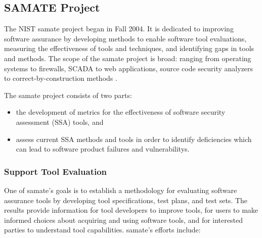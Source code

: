 \subsection{SAMATE Project}

The NIST \gls{samate} project began in Fall 2004. It is dedicated to improving software assurance by developing methods to enable software tool evaluations, measuring the effectiveness of tools and techniques, and identifying gaps in tools and methods. The scope of the \gls{samate} project is broad: ranging from operating systems to firewalls, SCADA to web applications, source code security analyzers to correct-by-construction methods \cite{nist2016samatepresentation}.

The \gls{samate} project consists of two parts:

\begin{itemize}
    \item the development of metrics for the effectiveness of software security assessment (SSA) tools, and
    \item assess current SSA methods and tools in order to identify deficiencies which can lead to software product failures and \glspl{vulnerability}. 
\end{itemize}

\clearpage

\subsubsection{Support Tool Evaluation}

One of \gls{samate}'s goals is to establish a methodology for evaluating software assurance tools by developing tool specifications, test plans, and test sets. The results provide information for tool developers to improve tools, for users to make informed choices about acquiring and using software tools, and for interested parties to understand tool capabilities. \gls{samate}'s efforts include:


